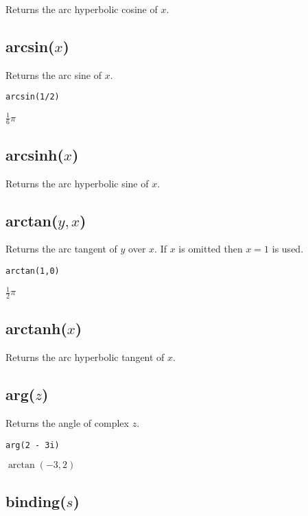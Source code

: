 Returns the arc hyperbolic cosine of $x$.

\subsection*{arcsin($x$)}

Returns the arc sine of $x$.

{\color{blue}
\begin{verbatim}
arcsin(1/2)
\end{verbatim}
}

\noindent
$\tfrac{1}{6}\pi$

\subsection*{arcsinh($x$)}

Returns the arc hyperbolic sine of $x$.

\subsection*{arctan($y,x$)}

Returns the arc tangent of $y$ over $x$.
If $x$ is omitted then $x=1$ is used.

{\color{blue}
\begin{verbatim}
arctan(1,0)
\end{verbatim}
}

\noindent
$\tfrac{1}{2}\pi$

\subsection*{arctanh($x$)}

Returns the arc hyperbolic tangent of $x$.

\subsection*{arg($z$)}

Returns the angle of complex $z$.

{\color{blue}
\begin{verbatim}
arg(2 - 3i)
\end{verbatim}
}

\noindent
$\arctan(-3,2)$

\subsection*{binding($s$)}

